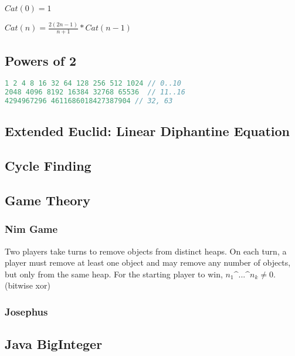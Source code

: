 \documentclass[a4paper,landscape,8pt]{article}
\begin{document}
\begin{multicols}{2}
$Cat(0) = 1$

$Cat(n) = \frac{2(2n - 1)}{n + 1} * Cat(n - 1)$

\subsection{Powers of 2}
\begin{lstlisting}[language=C++]
1 2 4 8 16 32 64 128 256 512 1024 // 0..10
2048 4096 8192 16384 32768 65536  // 11..16
4294967296 4611686018427387904 // 32, 63
\end{lstlisting}

\subsection{Extended Euclid: Linear Diphantine Equation}


\subsection{Cycle Finding}


\subsection{Game Theory}

\subsubsection{Nim Game}

Two players take turns to remove objects from distinct heaps. On each turn, a player must remove at least one object and may remove any number of objects, but only from the same heap. For the starting player to win, $n_1 \text{\textasciicircum{}} ... \text{\textasciicircum{}} n_k \neq 0$. (bitwise xor)

\subsubsection{Josephus}



\subsection{Java BigInteger}




\end{multicols}
\end{document}
